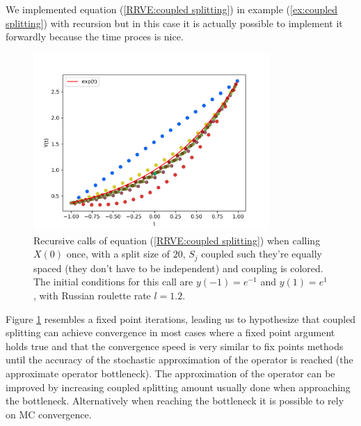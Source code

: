 \documentclass[a4paper,12pt]{article}
\begin{document}
\begin{pythonn} \label{py:coupled splitting}
    We implemented equation (\ref{RRVE:coupled splitting}) in example
    (\ref{ex:coupled splitting}) with recursion but in this case it
    is actually possible to implement it forwardly because the time
    proces is nice. \\

    \begin{figure}[h!]
        \centering
        \includegraphics[width=0.8\textwidth]{plots/coupled split.png}
        \caption{Recursive calls of equation (\ref{RRVE:coupled splitting}) when
        calling $X(0)$ once,
        with a split size of $20$, $S_{j}$ coupled such
        they're equally spaced (they don't have to be independent) and coupling is colored.
        The initial conditions for this call are $y(-1)=e^{-1}$ and $y(1)=e^{1}$,
        with Russian roulette rate $l=1.2$.  }
        \label{fig:coupled splitting}
    \end{figure}
\end{pythonn}


Figure \ref{fig:coupled splitting}
resembles a fixed point iterations, leading us to hypothesize
that coupled splitting can achieve convergence in most cases
where a fixed point argument holds true and that the convergence
speed is very similar to fix points methods until the accuracy
of the stochastic approximation of the operator is reached
(the approximate operator bottleneck). The approximation of the operator
can be improved by increasing coupled splitting amount usually done when
approaching the bottleneck. Alternatively when reaching
the bottleneck it is possible to rely on MC convergence.
\\
\end{document}
